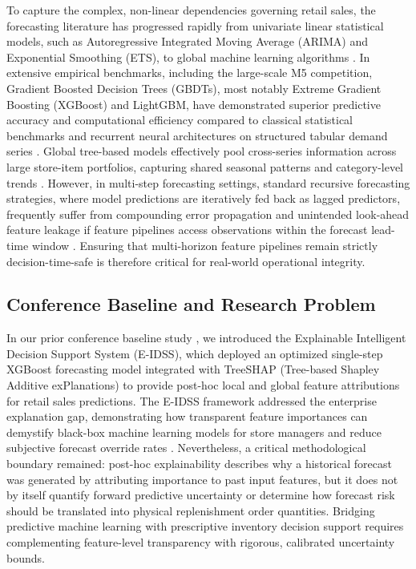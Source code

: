 To capture the complex, non-linear dependencies governing retail sales, the forecasting literature has progressed rapidly from univariate linear statistical models, such as Autoregressive Integrated Moving Average (ARIMA) and Exponential Smoothing (ETS), to global machine learning algorithms \cite{mustapha2025forecasting, yeesin2024application}. In extensive empirical benchmarks, including the large-scale M5 competition, Gradient Boosted Decision Trees (GBDTs), most notably Extreme Gradient Boosting (XGBoost) and LightGBM, have demonstrated superior predictive accuracy and computational efficiency compared to classical statistical benchmarks and recurrent neural architectures on structured tabular demand series \cite{makridakis2022m5, chen2016xgboost, hobor2026comparative}. Global tree-based models effectively pool cross-series information across large store-item portfolios, capturing shared seasonal patterns and category-level trends \cite{alghurabli2025ai}. However, in multi-step forecasting settings, standard recursive forecasting strategies, where model predictions are iteratively fed back as lagged predictors, frequently suffer from compounding error propagation and unintended look-ahead feature leakage if feature pipelines access observations within the forecast lead-time window \cite{tiwari2026explainable}. Ensuring that multi-horizon feature pipelines remain strictly decision-time-safe is therefore critical for real-world operational integrity.

\subsection{Conference Baseline and Research Problem}
In our prior conference baseline study \cite{e_idss_ieee}, we introduced the Explainable Intelligent Decision Support System (E-IDSS), which deployed an optimized single-step XGBoost forecasting model integrated with TreeSHAP (Tree-based Shapley Additive exPlanations) \cite{lundberg2017unified} to provide post-hoc local and global feature attributions for retail sales predictions. The E-IDSS framework addressed the enterprise explanation gap, demonstrating how transparent feature importances can demystify black-box machine learning models for store managers and reduce subjective forecast override rates \cite{lin2026critical, narlawar2025explainable, chang2025explainable}. Nevertheless, a critical methodological boundary remained: post-hoc explainability describes why a historical forecast was generated by attributing importance to past input features, but it does not by itself quantify forward predictive uncertainty or determine how forecast risk should be translated into physical replenishment order quantities. Bridging predictive machine learning with prescriptive inventory decision support requires complementing feature-level transparency with rigorous, calibrated uncertainty bounds.

